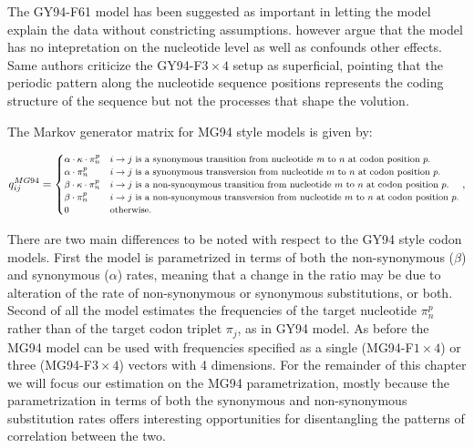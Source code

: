 The GY94-F61 model has been suggested as important in letting the model explain the data without constricting assumptions.
\citet{Rodrigue2008} however argue that the model has no intepretation on the nucleotide level as well as confounds other effects. 
Same authors criticize the GY94-F$3\times4$ setup as superficial, pointing that the periodic pattern along the nucleotide sequence positions represents the coding structure of the sequence but not the processes that shape the volution.

The Markov generator matrix for MG94 style models \citep{Muse1994} is given by:

\begin{equation}
\footnotesize{
q_{ij}^{MG94}=\begin{cases}
\alpha\cdot\kappa\cdot\pi_{n}^{p} & i\rightarrow j\text{ is a synonymous transition from nucleotide \textit{m} to \ensuremath{n} at codon position \ensuremath{p}.}\\
\alpha\cdot\pi_{n}^{p} & i\rightarrow j\text{ is a synonymous transversion from nucleotide \ensuremath{m} to \ensuremath{n} at codon position \ensuremath{p}.}\\
\beta\cdot\kappa\cdot\pi_{n}^{p} & i\rightarrow j\text{ is a non-synonymous transition from nucleotide \ensuremath{m} to \ensuremath{n} at codon position \ensuremath{p}.}\\
\beta\cdot\pi_{n}^{p} & i\rightarrow j\text{ is a non-synonymous transversion from nucleotide \ensuremath{m} to \ensuremath{n} at codon position \ensuremath{p}.}\\
0 & \text{otherwise.}
\end{cases},
} %
\label{eq:mg94}
\end{equation}


There are two main differences to be noted with respect to the GY94 style codon models.
First the model is parametrized in terms of both the non-synonymous ($\beta$) and synonymous ($\alpha$) rates, meaning that a change in the ratio may be due to alteration of the rate of non-synonymous or synonymous substitutions, or both.
Second of all the model estimates the frequencies of the target nucleotide $\pi_{n}^{p}$ rather than of the target codon triplet $\pi_{j}$, as in GY94 model.
As before the MG94 model can be used with frequencies specified as a single (MG94-F$1\times4$) or three (MG94-F$3\times4$) vectors with 4 dimensions.
For the remainder of this chapter we will focus our estimation on the MG94 parametrization, mostly because the parametrization in terms of both the synonymous and non-synonymous substitution rates offers interesting opportunities for disentangling
the patterns of correlation between
the two.


